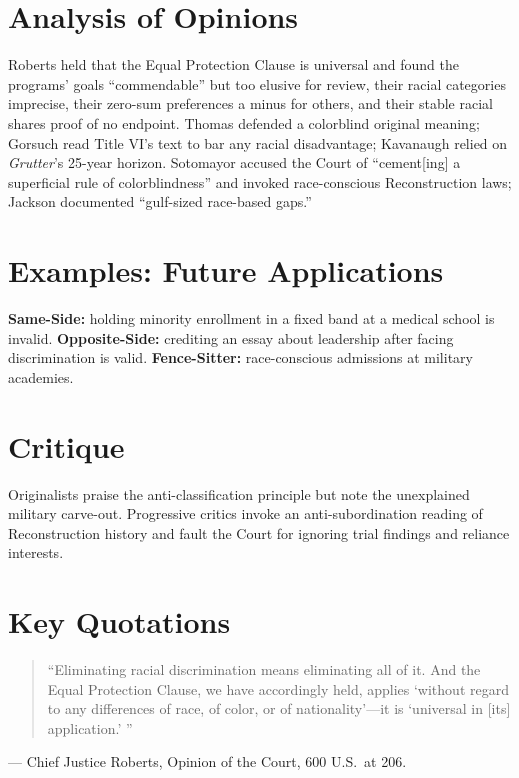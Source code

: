 \documentclass[12pt]{article}
\begin{document}
\section{Analysis of Opinions}
Roberts held that the Equal Protection Clause is universal and found the programs' goals ``commendable'' but too elusive for review, their racial categories imprecise, their zero-sum preferences a minus for others, and their stable racial shares proof of no endpoint. Thomas defended a colorblind original meaning; Gorsuch read Title VI's text to bar any racial disadvantage; Kavanaugh relied on \textit{Grutter}'s 25-year horizon. Sotomayor accused the Court of ``cement[ing] a superficial rule of colorblindness'' and invoked race-conscious Reconstruction laws; Jackson documented ``gulf-sized race-based gaps.''

\section{Examples: Future Applications}
\textbf{Same-Side:} holding minority enrollment in a fixed band at a medical school is invalid. \textbf{Opposite-Side:} crediting an essay about leadership after facing discrimination is valid. \textbf{Fence-Sitter:} race-conscious admissions at military academies.

\section{Critique}
Originalists praise the anti-classification principle but note the unexplained military carve-out. Progressive critics invoke an anti-subordination reading of Reconstruction history and fault the Court for ignoring trial findings and reliance interests.

\section{Key Quotations}
\begin{quote}
``Eliminating racial discrimination means eliminating all of it. And the Equal Protection Clause, we have accordingly held, applies `without regard to any differences of race, of color, or of nationality'---it is `universal in [its] application.' ''
\end{quote}
\noindent --- Chief Justice Roberts, Opinion of the Court, 600 U.S.\ at 206.
\end{document}

